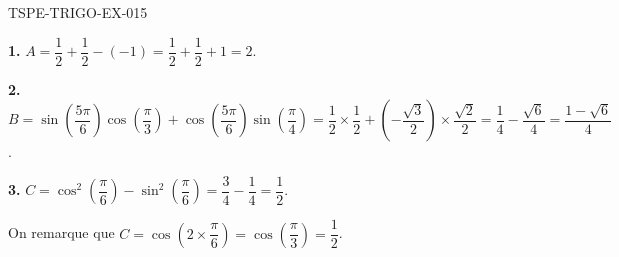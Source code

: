 \begin{corrige}{TSPE-TRIGO-EX-015}

\textbf{1.} $A = \dfrac{1}{2} + \dfrac{1}{2} - (-1) = \dfrac{1}{2} + \dfrac{1}{2} + 1 = 2$.

\textbf{2.} $B = \sin\!\left(\dfrac{5\pi}{6}\right)\cos\!\left(\dfrac{\pi}{3}\right) + \cos\!\left(\dfrac{5\pi}{6}\right)\sin\!\left(\dfrac{\pi}{4}\right) = \dfrac{1}{2} \times \dfrac{1}{2} + \left(-\dfrac{\sqrt{3}}{2}\right) \times \dfrac{\sqrt{2}}{2} = \dfrac{1}{4} - \dfrac{\sqrt{6}}{4} = \dfrac{1 - \sqrt{6}}{4}$.

\textbf{3.} $C = \cos^2\!\left(\dfrac{\pi}{6}\right) - \sin^2\!\left(\dfrac{\pi}{6}\right) = \dfrac{3}{4} - \dfrac{1}{4} = \dfrac{1}{2}$.

On remarque que $C = \cos\!\left(2 \times \dfrac{\pi}{6}\right) = \cos\!\left(\dfrac{\pi}{3}\right) = \dfrac{1}{2}$. \checkmark

\end{corrige}
